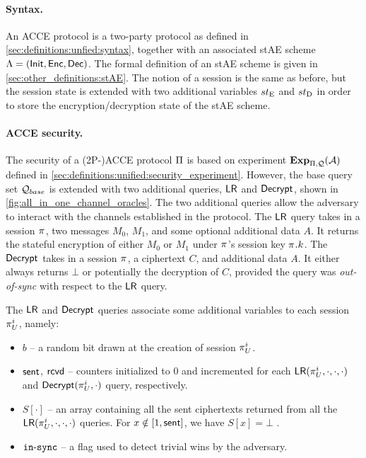 \paragraph{Syntax.}
An ACCE protocol is a two-party protocol as defined in \cref{sec:definitions:unfied:syntax},
together with an associated stAE scheme
$\Lambda = (\mathsf{Init},\mathsf{Enc},\mathsf{Dec})$.
The formal definition of an stAE scheme is given in \cref{sec:other_definitions:stAE}.
The notion of a session is the same as before,
but the session state is extended with two additional variables $st_{\mathrm{E}}$ and $st_{\mathrm{D}}$ in order to store the encryption/decryption state of the stAE scheme.  




\paragraph{ACCE security.}
The security of a (2P-)ACCE protocol $\mathrm{\Pi}$ is based on experiment $\mathbf{Exp}_{\mathrm{\Pi},\mathcal{Q}}^{}(\mathcal{A})$ defined in \cref{sec:definitions:unified:security_experiment}.
However,
the base query set $\mathcal{Q}_{base}$ is extended with two additional queries,
$\mathsf{LR}$ and $\mathsf{Decrypt}$,
shown in \cref{fig:all_in_one_channel_oracles}.
The two additional queries allow the adversary to interact with the channels established in the protocol.
The $\mathsf{LR}$ query takes in a session $\oracle$, 
two messages $M_0$, $M_1$,
and some optional additional data $A$.
It returns the stateful encryption of either $M_0$ or $M_1$ under $\oracle$'s session key $\oracle.\key$.
The $\mathsf{Decrypt}$ takes in a session $\oracle$,
a ciphertext $C$,
and additional data $A$.
It either always returns $\bot$ or potentially the decryption of $C$,
provided the query was \emph{out-of-sync} with  respect to the $\mathsf{LR}$ query.

The $\mathsf{LR}$ and $\mathsf{Decrypt}$ queries associate some additional variables to each session $\oracle[U][i]$,
namely:
\begin{itemize}
	\item $b$ -- a random bit drawn at the creation of session $\oracle[U][i]$.
	
	\item $\mathsf{sent}$, $\mathsf{rcvd}$ -- counters  initialized to $0$ and incremented for each $\Encrypt(\oracle[U][i], \cdot, \cdot, \cdot)$ and $\Decrypt(\oracle[U][i], \cdot)$ query, respectively.
	
	\item $S[\cdot]$ -- an array containing all the sent ciphertexts returned from all the $\Encrypt(\oracle[U][i], \cdot, \cdot, \cdot)$ queries. 
	For $x \notin [1, \mathsf{sent}]$, we have $S[x] = \bot$ .
	
	\item $\operatorname{\mathtt{in-sync}}$ -- a flag used to detect trivial wins by the adversary. 
	  
\end{itemize}

